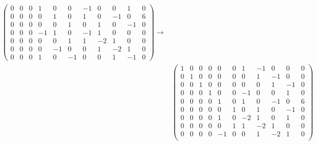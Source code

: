 ﻿\documentclass{book} \usepackage{exsheets} \usepackage{xeCJK}
\begin{document}
\begin{solution}
\begin{align*}
\begin{pmatrix}
                                                                0&0&0&1&0&0&-1&0&0&1&0\\
                                                                0&0&0&0&1&0&1&0&-1&0&6\\
                                                                0&0&0&0&0&1&0&1&0&-1&0\\
                                                                0&0&0&-1&1&0&-1&1&0&0&0\\
                                                                0&0&0&0&0&1&1&-2&1&0&0\\
                                                                0&0&0&0&-1&0&0&1&-2&1&0\\
                                                                0&0&0&1&0&-1&0&0&1&-1&0
                                                              \end{pmatrix}
                                                                                       \to\\&
                                                                                              \begin{pmatrix}
                                                                                                1&0&0&0&0&0&1&-1&0&0&0\\
                                                                                                0&1&0&0&0&0&0&1&-1&0&0\\
                                                                                                0&0&1&0&0&0&0&0&1&-1&0\\
                                                                                                0&0&0&1&0&0&-1&0&0&1&0\\
                                                                                                0&0&0&0&1&0&1&0&-1&0&6\\
                                                                                                0&0&0&0&0&1&0&1&0&-1&0\\
                                                                                                0&0&0&0&1&0&-2&1&0&1&0\\
                                                                                                0&0&0&0&0&1&1&-2&1&0&0\\
                                                                                                0&0&0&0&-1&0&0&1&-2&1&0\\

\end{pmatrix}
\end{align*}
\end{solution}
\end{document}
